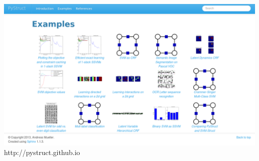 \documentclass{beamer}
\begin{document}
    \begin{frame}
        \begin{center}
            \includegraphics[width=\linewidth]{images/example_gallery}\\
            http://pystruct.github.io
        \end{center}
    \end{frame}
    
	
\end{document}
